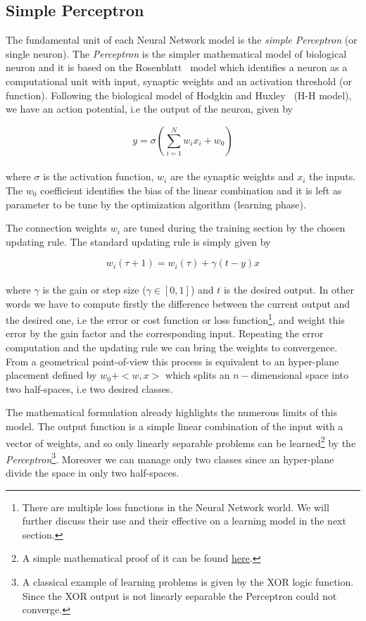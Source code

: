 \documentclass{standalone}
\begin{document}
\subsection[Simple Perceptron]{Simple Perceptron}\label{NN:perceptron}

The fundamental unit of each Neural Network model is the \emph{simple Perceptron} (or single neuron).
The \emph{Perceptron} is the simpler mathematical model of biological neuron and it is based on the Rosenblatt~\cite{Rosenblatt58theperceptron} model which identifies a neuron as a computational unit with input, synaptic weights and an activation threshold (or function).
Following the biological model of Hodgkin and Huxley~\cite{HHmodel} (H-H model), we have an action potential, i.e the output of the neuron, given by

$$
y = \sigma\left(\sum_{i=1}^{N}w_i x_i + w_0 \right)
$$
\\
where $\sigma$ is the activation function, $w_i$ are the synaptic weights and $x_i$ the inputs.
The $w_0$ coefficient identifies the bias of the linear combination and it is left as parameter to be tune by the optimization algorithm (learning phase).

The connection weights $w_i$ are tuned during the training section by the chosen updating rule.
The standard updating rule is simply given by

$$
w_i(\tau + 1) = w_i(\tau) + \gamma(t - y)x
$$
\\
where $\gamma$ is the gain or step size ($\gamma \in [0, 1]$) and $t$ is the desired output.
In other words we have to compute firstly the difference between the current output and the desired one, i.e the error or cost function or loss function\footnote{
  There are multiple loss functions in the Neural Network world.
  We will further discuss their use and their effective on a learning model in the next section.
}, and weight this error by the gain factor and the corresponding input.
Repeating the error computation and the updating rule we can bring the weights to convergence.
From a geometrical point-of-view this process is equivalent to an hyper-plane placement defined by $w_0 + < w, x >$ which splits an $n-$dimensional space into two half-spaces, i.e two desired classes.

The mathematical formulation already highlights the numerous limits of this model.
The output function is a simple linear combination of the input with a vector of weights, and so only linearly separable problems can be learned\footnote{
  A simple mathematical proof of it can be found \href{http://www.cs.columbia.edu/~mcollins/courses/6998-2012/notes/perc.converge.pdf}{here}.
} by the \emph{Perceptron}\footnote{
  A classical example of learning problems is given by the XOR logic function.
  Since the XOR output is not linearly separable the Perceptron could not converge.
}.
Moreover we can manage only two classes since an hyper-plane divide the space in only two half-spaces.
\end{document}
